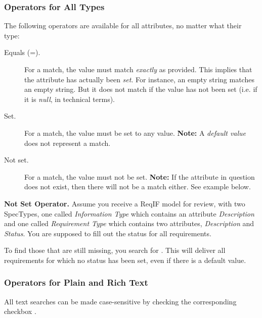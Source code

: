 \subsubsection{Operators for All Types}

The following operators are available for all attributes, no matter what their type:

\begin{description}
\item[Equals (=).] For a match, the value must match \textit{exactly} as provided.  This implies that the attribute has actually been \textit{set}.  For instance, an empty string matches an empty string.  But it does not match if the value has not been set (i.e. if it is \textit{null}, in technical terms).
\item[Set.] For a match, the value must be set to any value. \textbf{Note:} A \textit{default value} does not represent a match.
\item[Not set.] For a match, the value must not be set. \textbf{Note:} If the attribute in question does not exist, then there will not be a match either.  See example below.
\end{description}

\begin{example}
\textbf{Not Set Operator.}
Assume you receive a ReqIF model for review, with two SpecTypes, one called \textit{Information Type} which contains an attribute \textit{Description} and one called \textit{Requirement Type} which contains two attributes, \textit{Description} and \textit{Status}.  You are supposed to fill out the status for all requirements.

To find those that are still missing, you search for  .  This will deliver all requirements for which no status has been set, even if there is a default value.
\end{example}

\subsubsection{Operators for Plain and Rich Text}

All text searches can be made case-sensitive by checking the corresponding checkbox .

